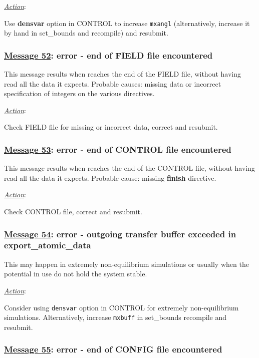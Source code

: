\noindent \underline{\em Action}:

Use {\bf densvar} option in CONTROL to increase {\tt mxangl}
(alternatively, increase it by hand in {\sc set\_bounds} and
recompile) and resubmit.

\subsubsection*{\underline{Message 52}: error - end of FIELD file encountered}

This message results when \D reaches the end of the FIELD file,
without having read all the data it expects.  Probable causes:
missing data or incorrect specification of integers on the various
directives.

\noindent \underline{\em Action}:

Check FIELD file for missing or incorrect data, correct and
resubmit.

\subsubsection*{\underline{Message 53}: error - end of CONTROL file encountered}

This message results when \D reaches the end of the CONTROL file,
without having read all the data it expects.  Probable cause:
missing {\bf finish} directive.

\noindent \underline{\em Action}:

Check CONTROL file, correct and resubmit.

\subsubsection*{\underline{Message 54}: error - outgoing transfer buffer exceeded in export\_atomic\_data}

This may happen in extremely non-equilibrium simulations or
usually when the potential in use do not hold the system stable.

\noindent \underline{\em Action}:

Consider using {\tt densvar} option in CONTROL for extremely
non-equilibrium simulations.  Alternatively, increase {\tt mxbuff}
in {\sc set\_bounds} recompile and resubmit.

\subsubsection*{\underline{Message 55}: error - end of CONFIG file encountered}

